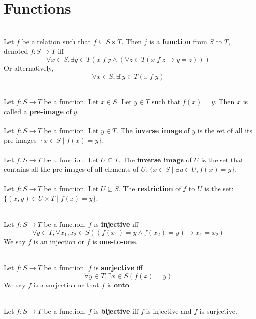 \documentclass[12pt]{article}
\begin{document}
\clearpage
\section{Functions}
\begin{definition}[Function(7.1.1)]
\hfill\\
\normalfont Let $f$ be a relation such that $f\subseteq S\times T$. Then $f$ is a \textbf{function} from $S$ to $T$, denoted $f: S\to T$ iff
\[
\forall x\in S, \exists y\in T (x\;f\;y\land(\forall z\in T(x\;f\;z\rightarrow y=z)))
\]
Or alternatively,
\[
\forall x\in S, \exists !y\in T(x\;f\;y)
\]
\end{definition}
\begin{definition}
\hfill\\
\normalfont
Let $f : S \to T$ be a function. Let $x \in S$. Let $y \in T$ such that $f (x) = y$. Then $x$ is called a 
\textbf{pre-image} of $y$.\\\\
Let $f : S \to T$ be a function. Let $y \in T$. The \textbf{inverse image} of $y$ is the set of all its pre-images: $\{x \in S \mid f (x) = y\}$.\\\\
Let $f : S \to T$ be a function. Let $U\subseteq T$. The \textbf{inverse image} of $U$ is the set that contains all the pre-images of all elements of $U$: $\{x \in S \mid \exists u\in U, f (x) = y\}$.\\\\
Let $f: S\to T$ be a function. Let $U\subseteq S$. The \textbf{restriction} of $f$ to $U$ is the set: $\{(x,y)\in U\times T\mid f(x)=y\}$.
\end{definition}
\begin{definition}[Injective(7.2.1)]
\hfill\\
\normalfont Let $f:S\to T$ be a function. $f$ is \textbf{injective} iff
\[
\forall y\in T, \forall x_1,x_2\in S((f(x_1)=y\land f(x_2)=y)\rightarrow x_1=x_2)
\]
We say $f$ is an injection or $f$ is \textbf{one-to-one}.
\end{definition}
\begin{definition}[Surjective(7.2.2)]
\hfill\\
\normalfont Let $f:S\to T$ be a function. $f$ is \textbf{surjective} iff
\[
\forall y\in T, \exists x\in S(f(x)=y)
\]
We say $f$ is a surjection or that $f$ is \textbf{onto}.
\end{definition}
\begin{definition}[Bijective(7.2.3)]
\hfill\\
\normalfont Let $f:S\to T$ be a function. $f$ is \textbf{bijective} iff $f$ is injective and $f$ is surjective.
\end{definition}
\end{document}
